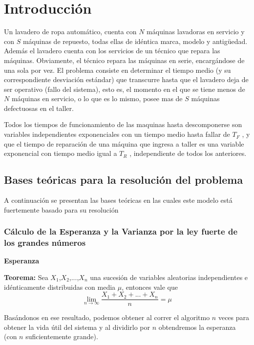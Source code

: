 \documentclass[12pt]{article}
\begin{document}
\pagebreak
\section{Introducción}
\vspace{0.4in}
Un lavadero de ropa automático, cuenta con $N$ máquinas lavadoras en servicio y con $S$ máquinas de
repuesto, todas ellas de idéntica marca, modelo y antigüedad. Además el lavadero cuenta con los servicios
de un técnico que repara las máquinas. Obviamente, el técnico repara las máquinas en serie, encargándose
de una sola por vez. El problema consiste en determinar el tiempo medio (y su correspondiente desviación
estándar) que transcurre hasta que el lavadero deja de ser operativo (fallo del sistema), esto es, el momento
en el que se tiene menos de $N$ máquinas en servicio, o lo que es lo mismo, posee mas de $S$ máquinas
defectuosas en el taller.

Todos los tiempos de funcionamiento de las maquinas hasta descomponerse son variables independientes
exponenciales con un tiempo medio hasta fallar de $T_{F}$ , y que el tiempo de reparación de una máquina
que ingresa a taller es una variable exponencial con tiempo medio igual a $T_{R}$ , independiente de todos los
anteriores.
\vspace{0.4in}
\subsection{Bases teóricas para la resolución del problema}
A continuación se presentan las bases teóricas en las cuales este modelo
está fuertemente basado para su resolución
\subsubsection{Cálculo de la Esperanza y la Varianza por la ley fuerte de los grandes números}
\vspace{0.2in}
{\bf Esperanza}
\vspace{0.15in}

{\bf Teorema:} Sea $X_1$,$X_2$,...,$X_n$ una sucesión de variables aleatorias independientes
e idénticamente distribuidas con media $\mu$, entonces vale que
\[\lim\limits_{n\rightarrow \infty}\frac{X_1+X_2+...+X_n}{n}=\mu\]

Basándonos en ese resultado, podemos obtener al correr el algoritmo $n$ veces para obtener la vida útil
del sistema y al dividirlo por $n$ obtendremos la esperanza (con $n$ suficientemente grande).
\vspace{0.3in}
\end{document}
